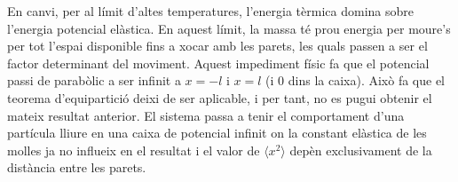 \documentclass[a4paper, 10pt]{article}
\begin{document}
\begin{enumerate}
\begin{enumerate}
	En canvi, per al límit d'altes temperatures, l'energia tèrmica domina sobre l'energia potencial elàstica. En aquest límit, la massa té prou energia per moure's per tot l'espai disponible fins a xocar amb les parets, les quals passen a ser el factor determinant del moviment. Aquest impediment físic fa que el potencial passi de parabòlic a ser infinit a $x= -l $ i $ x = l$ (i 0 dins la caixa). Això fa que el teorema d'equipartició deixi de ser aplicable, i per tant, no es pugui obtenir el mateix resultat anterior. El sistema passa a tenir el comportament d'una partícula lliure en una caixa de potencial infinit on la constant elàstica de les molles ja no influeix en el resultat i el valor de $\langle x^2 \rangle$ depèn exclusivament de la distància entre les parets. 
	

	
\end{enumerate}

	
\end{enumerate}
\end{document}
